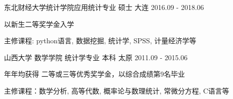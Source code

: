 

\begin{cventries}

  \cventry
    {东北财经大学统计学院应用统计专业} %
    {硕士} %
    {大连} %
    {2016.09 - 2018.06} %
    {
      \begin{cvitems} %
        \item {以新生二等奖学金入学}
        \item  {主修课程: python语言, 数据挖掘, 统计学, SPSS, 计量经济学等}
      \end{cvitems}
    }

  \cventry
    {山西大学 数学学院 统计学专业} %
    {本科} %
    {太原} %
    {2011.09 - 2015.06} %
    {
      \begin{cvitems} %
        \item {年年均获得 二等或三等优秀奖学金，以综合成绩第9名毕业}
        \item  {主修课程：数学分析, 高等代数, 概率论与数理统计, 常微分方程, C语言等}
      \end{cvitems}
    }


\end{cventries}
